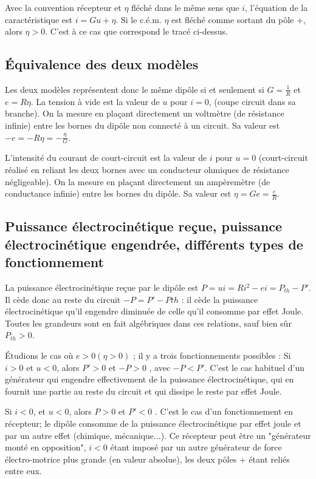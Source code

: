 Avec la convention récepteur et \(\eta\) fléché dans le même sens que \(i\), l'équation de la caractéristique est \(i=Gu+\eta\). Si le c.é.m. \(\eta\) est fléché comme sortant du pôle +, alors \(\eta > 0\). C'est à ce cas que correspond le tracé ci-dessus.

\subsection{Équivalence des deux modèles}

Les deux modèles représentent donc le même dipôle si et seulement si \(G=\frac{1}{R}\) et \(e = R \eta\). La tension à vide est la valeur de \(u\) pour \(i = 0\), (coupe circuit dans sa branche). On la mesure en plaçant directement un voltmètre (de résistance infinie) entre les bornes du dipôle non connecté à un circuit. Sa valeur est \(-e = -R\eta = -\frac{\eta}{G}\).

L'intensité du courant de court-circuit est la valeur de \(i\) pour \(u = 0\) (court-circuit réalisé en reliant les deux bornes avec un conducteur ohmiques de résistance négligeable). On la mesure en plaçant directement un ampèremètre (de conductance infinie) entre les bornes du dipôle. Sa valeur est \(\eta = Ge = \frac{e}{R}\).

\subsection{Puissance électrocinétique reçue, puissance électrocinétique
engendrée, différents types de fonctionnement}

La puissance électrocinétique reçue par le dipôle est \(P  = u i = R i^2 - e i = P_{th} - P'\). Il cède donc au reste du circuit \(-P  = P' -P{th}\) : il cède la puissance électrocinétique qu'il engendre diminuée de celle qu'il consomme par effet Joule. Toutes les grandeurs sont en fait algébriques dans ces relations, sauf  bien sûr \(P_{th} > 0\).

Étudions le cas où \(e > 0 (\eta > 0)\) ; il y a trois fonctionnements possibles :
Si \(i > 0\)  et \(u < 0\), alors \(P'> 0\) et \(-P  > 0\) , avec \(-P  < P'\). C'est le cas habituel d'un générateur qui engendre effectivement de la puissance électrocinétique, qui en fournit une partie au reste du circuit et qui dissipe le reste par effet Joule.

Si \(i < 0\), et \(u < 0\), alors \(P > 0\) et \(P' < 0\) . C'est le cas d'un fonctionnement en récepteur; le dipôle consomme de la puissance électrocinétique par effet joule et par un autre effet (chimique, mécanique...). Ce récepteur peut être un "générateur monté en opposition", \(i < 0\) étant imposé par un autre générateur de force électro-motrice plus grande (en valeur absolue), les deux pôles + étant reliés entre eux.

